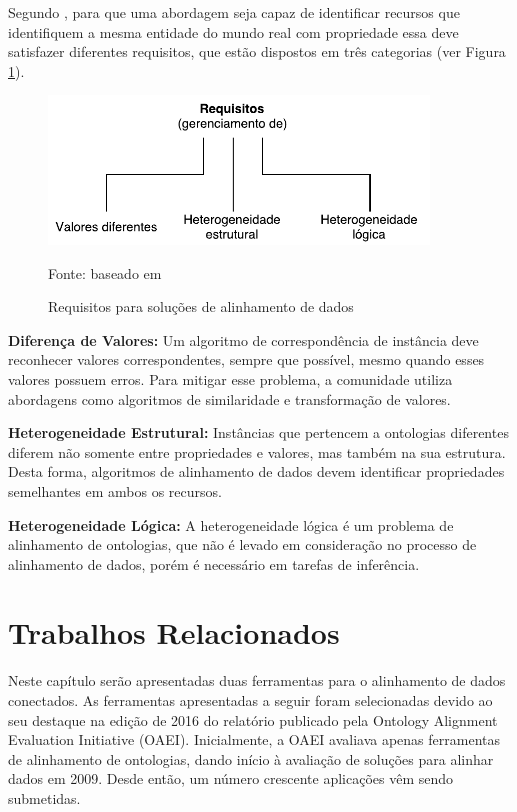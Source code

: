 Segundo , para que uma abordagem seja capaz de identificar recursos que identifiquem a mesma entidade do mundo real com propriedade essa deve satisfazer diferentes requisitos, que estão  dispostos em três categorias (ver Figura \ref{fig:imrequirements}).

\begin{figure}[!ht]
	\centering
	\includegraphics[width=0.9\textwidth]{./imagens/im_requirements.pdf}
    \caption{Requisitos para soluções de alinhamento de dados}
	\footnotesize{Fonte: baseado em \cite{ferrara2008towards}}
	\label{fig:imrequirements}
\end{figure}

\textbf{Diferença de Valores:}
Um algoritmo de correspondência de instância deve reconhecer valores correspondentes, sempre que possível, mesmo quando esses valores possuem erros. Para mitigar esse problema, a comunidade utiliza abordagens como algoritmos de similaridade e transformação de valores.


\textbf{Heterogeneidade Estrutural:}
Instâncias que pertencem a ontologias diferentes diferem não somente entre propriedades e valores, mas também na sua estrutura. Desta forma, algoritmos de alinhamento de dados devem identificar propriedades semelhantes em ambos os recursos.


\textbf{Heterogeneidade Lógica:}
A heterogeneidade lógica é um problema de alinhamento de ontologias, que não é levado em consideração no processo de alinhamento de dados, porém é necessário em tarefas de inferência.

\section{Trabalhos Relacionados}
\label{cap:relacionados}
Neste capítulo serão apresentadas duas ferramentas para o alinhamento de dados conectados. As ferramentas apresentadas a seguir foram selecionadas devido ao seu destaque na edição de 2016 do relatório publicado pela Ontology Alignment Evaluation Initiative (OAEI). Inicialmente, a OAEI avaliava apenas ferramentas de alinhamento de ontologias, dando início à avaliação de soluções para alinhar dados em 2009. Desde então, um número crescente aplicações vêm sendo submetidas.

